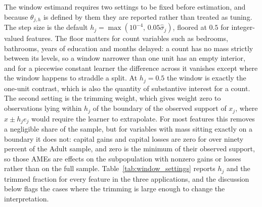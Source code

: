 \documentclass[12pt]{article}
\begin{document}
The window estimand requires two settings to be fixed before estimation, and because $\theta_{j,h}$ is defined by them they are reported rather than treated as tuning. The step size is the default $h_j = \max(10^{-4},\, 0.05\hat{\sigma}_j)$, floored at $0.5$ for integer-valued features. The floor matters for count variables such as bedrooms, bathrooms, years of education and months delayed: a count has no mass strictly between its levels, so a window narrower than one unit has an empty interior, and for a piecewise constant learner the difference across it vanishes except where the window happens to straddle a split. At $h_j = 0.5$ the window is exactly the one-unit contrast, which is also the quantity of substantive interest for a count. The second setting is the trimming weight, which gives weight zero to observations lying within $h_j$ of the boundary of the observed support of $x_j$, where $x \pm h_j e_j$ would require the learner to extrapolate. For most features this removes a negligible share of the sample, but for variables with mass sitting exactly on a boundary it does not: capital gains and capital losses are zero for over ninety percent of the Adult sample, and zero is the minimum of their observed support, so those AMEs are effects on the subpopulation with nonzero gains or losses rather than on the full sample. Table~\ref{tab:window_settings} reports $h_j$ and the trimmed fraction for every feature in the three applications, and the discussion below flags the cases where the trimming is large enough to change the interpretation.
	
\end{document}
